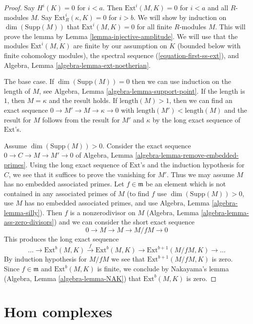 \begin{proof}
Say $H^i(K) = 0$ for $i < a$. Then $\text{Ext}^i(M, K) = 0$ for $i < a$ and
all $R$-modules $M$. Say $\text{Ext}^i_R(\kappa, K) = 0$ for $i > b$. We will
show by induction on $\dim(\text{Supp}(M))$ that $\text{Ext}^i(M, K) = 0$
for all finite $R$-modules $M$. This will prove the lemma by
Lemma \ref{lemma-injective-amplitude}. We will use that the modules
$\text{Ext}^i(M, K)$ are finite by our assumption on $K$
(bounded below with finite cohomology modules), the spectral
sequence (\ref{equation-first-ss-ext}), and
Algebra, Lemma \ref{algebra-lemma-ext-noetherian}.

\medskip\noindent
The base case. If $\dim(\text{Supp}(M)) = 0$ then we can use induction on the
length of $M$, see Algebra, Lemma \ref{algebra-lemma-support-point}.
If the length is $1$, then $M = \kappa$ and the result holds.
If $\text{length}(M) > 1$, then we can find an exact sequence
$0 \to M' \to M \to \kappa \to 0$ with $\text{length}(M') < \text{length}(M)$
and the result for $M$ follows from the result for $M'$ and $\kappa$
by the long exact sequence of $\text{Ext}$'s.

\medskip\noindent
Assume $\dim(\text{Supp}(M)) > 0$. Consider the exact sequence
$0 \to C \to M \to M' \to 0$
of Algebra, Lemma \ref{algebra-lemma-remove-embedded-primes}.
Using the long exact sequence of $\text{Ext}$'s and the induction hypothesis
for $C$, we see that it suffices to prove the vanishing for $M'$.
Thus we may assume $M$ has no embedded associated primes.
Let $f \in \mathfrak m$ be an element which is
not contained in any associated primes of $M$
(to find $f$ use $\dim(\text{Supp}(M)) > 0$, use $M$ has no embedded associated
primes, and use Algebra, Lemma \ref{algebra-lemma-silly}).
Then $f$ is a nonzerodivisor on $M$
(Algebra, Lemma \ref{algebra-lemma-ass-zero-divisors}) and
we can consider the short exact sequence
$$
0 \to M \to M \to M/fM \to 0
$$
This produces the long exact sequence
$$
\ldots \to
\text{Ext}^b(M, K) \xrightarrow{f} \text{Ext}^b(M, K) \to
\text{Ext}^{b + 1}(M/fM, K) \to \ldots
$$
By induction hypothesis for $M/fM$ we see that $\text{Ext}^{b + 1}(M/fM, K)$
is zero. Since $f \in \mathfrak m$ and $\text{Ext}^b(M, K)$ is finite,
we conclude by Nakayama's lemma (Algebra, Lemma \ref{algebra-lemma-NAK})
that $\text{Ext}^b(M, K)$ is zero.
\end{proof}







\section{Hom complexes}
\label{section-hom-complexes}

